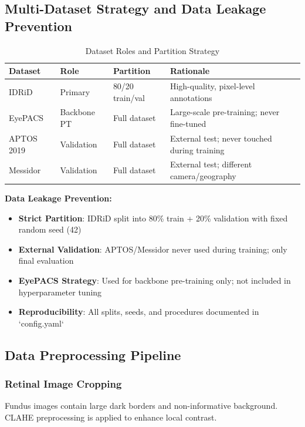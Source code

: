 \documentclass[12pt,a4paper]{article}
\begin{document}
\subsection{Multi-Dataset Strategy and Data Leakage Prevention}

\begin{table}[H]
\centering
\small
\caption{Dataset Roles and Partition Strategy}
\begin{tabular}{|p{2cm}|p{2cm}|p{2cm}|p{2cm}|}
\hline
\textbf{Dataset} & \textbf{Role} & \textbf{Partition} & \textbf{Rationale} \\
\hline
IDRiD & Primary & 80/20 train/val & High-quality, pixel-level annotations \\
EyePACS & Backbone PT & Full dataset & Large-scale pre-training; never fine-tuned \\
APTOS 2019 & Validation & Full dataset & External test; never touched during training \\
Messidor & Validation & Full dataset & External test; different camera/geography \\
\hline
\end{tabular}
\end{table}

\textbf{Data Leakage Prevention:}
\begin{itemize}
    \item \textbf{Strict Partition}: IDRiD split into 80\% train + 20\% validation with fixed random seed (42)
    \item \textbf{External Validation}: APTOS/Messidor never used during training; only final evaluation
    \item \textbf{EyePACS Strategy}: Used for backbone pre-training only; not included in hyperparameter tuning
    \item \textbf{Reproducibility}: All splits, seeds, and procedures documented in `config.yaml`
\end{itemize}

\subsection{Data Preprocessing Pipeline}

\subsubsection{Retinal Image Cropping}

Fundus images contain large dark borders and non-informative background. CLAHE preprocessing is applied to enhance local contrast.
\end{document}

